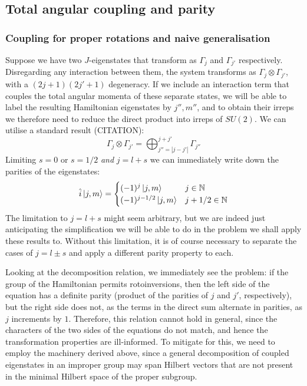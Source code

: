 \documentclass[12pt]{article}
\begin{document}
	\subsection{Total angular coupling and parity}
	
	\subsubsection{Coupling for proper rotations and naive generalisation}
	Suppose we have two $J$-eigenstates that transform as $\Gamma_{j}$ and $\Gamma_{j'}$ respectively. Disregarding any interaction between them, the system transforms as $\Gamma_{j}\otimes\Gamma_{j'}$, with a $(2j+1)(2j'+1)$ degeneracy. If we include an interaction term that couples the total angular momenta of these separate states, we will be able to label the resulting Hamiltonian eigenstates by $j'',m''$, and to obtain their irreps we therefore need to reduce the direct product into irreps of $SU(2)$. We can utilise a standard result (CITATION):
	$$\Gamma_j\otimes\Gamma_{j'}=\bigoplus_{j''=|j-j'|}^{j+j'}\Gamma_{j''}$$
	Limiting $s=0$ or $s=1/2$ \textit{and} $j=l+s$ we can immediately write down the parities of the eigenstates:
	$$\hat{i}\ket{j,m}=\begin{cases}
	(-1)^j\ket{j,m} & j\in\mathbb{N}\\
	(-1)^{j-1/2}\ket{j,m} & j+1/2\in\mathbb{N}
	\end{cases}$$
	The limitation to $j=l+s$ might seem arbitrary, but we are indeed just anticipating the simplification we will be able to do in the problem we shall apply these results to. Without this limitation, it is of course necessary to separate the cases of $j=l\pm s$ and apply a different parity property to each.
	
	Looking at the decomposition relation, we immediately see the problem: if the group of the Hamiltonian permits rotoinversions, then the left side of the equation has a definite parity (product of the parities of $j$ and $j'$, respectively), but the right side does not, as the terms in the direct sum alternate in parities, as $j$ increments by $1$. Therefore, this relation cannot hold in general, since the characters of the two sides of the equations do not match, and hence the transformation properties are ill-informed. To mitigate for this, we need to employ the machinery derived above, since a general decomposition of coupled eigenstates in an improper group may span Hilbert vectors that are not present in the minimal Hilbert space of the proper subgroup.
	
\end{document}
